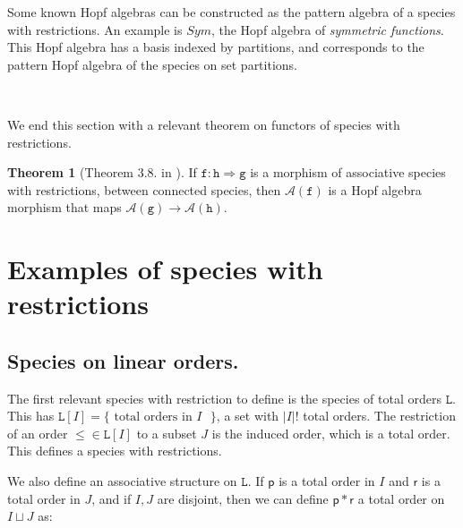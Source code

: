 \documentclass[12pt, reqno]{amsart}
\theoremstyle{definition}
\newtheorem{thm}{Theorem}[section]
\begin{document}
Some known Hopf algebras can be constructed as the pattern algebra of a species with restrictions.
An example is $Sym$, the Hopf algebra of \textit{symmetric functions}.
This Hopf algebra has a basis indexed by partitions, and corresponds to the pattern Hopf algebra of the species on set partitions.

\

We end this section with a relevant theorem on functors of species with restrictions.

\begin{thm}[Theorem 3.8. in \cite{Penaguiao2020}]\label{thm:functoriality}
    If $\mathtt{f} :\mathtt{h} \Rightarrow \mathtt{g}$ is a morphism of associative species with restrictions, between connected species, then $\mathcal A(\mathtt{f})$ is a Hopf algebra morphism that maps $\mathcal A(\mathtt{g}) \to \mathcal A(\mathtt{h})$.
\end{thm}

\section{Examples of species with restrictions \label{sec:species_restrictions}}

\subsection{Species on linear orders.\label{sec:specieslinearorders}}

The first relevant species with restriction to define is the species of total orders $\mathtt{L}$.
This has $\mathtt{L}[I] = \{\text{ total orders in $I$ }\}$, a set with $|I|!$ total orders.
The restriction of an order $\leq \in \mathtt{L}[I]$ to a subset $J$ is the induced order, which is a total order.
This defines a species with restrictions.

We also define an associative structure on $\mathtt{L}$.
If $\mathsf{p}$ is a total order in $I$ and $\mathsf{r}$ is a total order in $J$, and if $I, J$ are disjoint, then we can define $\mathsf{p} \ast\mathsf{r}$ a total order on $I \sqcup J$ as:
\end{document}

